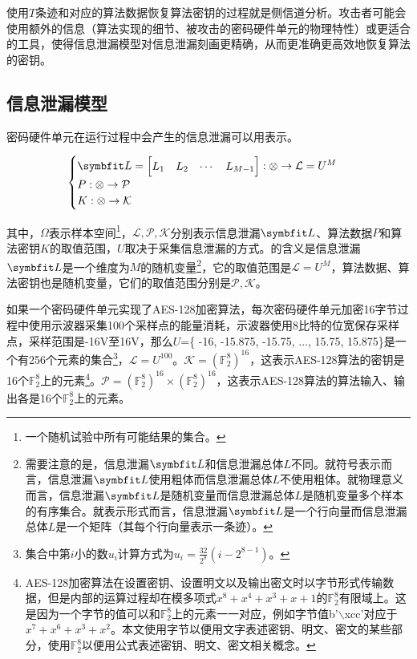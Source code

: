 {	使用$T$条迹和对应的算法数据恢复算法密钥的过程就是侧信道分析。攻击者可能会使用额外的信息（算法实现的细节、被攻击的密码硬件单元的物理特性）或更适合的工具，使得信息泄漏模型对信息泄漏刻画更精确，从而更准确更高效地恢复算法的密钥。
	
	\subsection{信息泄漏模型}
	
	密码硬件单元在运行过程中会产生的信息泄漏可以用表示。
	
	\begin{equation}
		\begin{cases}
			\Vector L=\begin{bmatrix}L_1&L_2&\cdots&L_{M-1}\end{bmatrix}:\mathcal \Omega\rightarrow \mathcal L=U^{M}\\
			P:\mathcal \Omega\rightarrow \mathcal P\\
			K:\mathcal \Omega\rightarrow \mathcal K
		\end{cases}\label{eq:leakagemodel}
	\end{equation}
	
	\noindent 其中，$\Omega$表示样本空间\footnote{一个随机试验中所有可能结果的集合。}，$\mathcal L,\mathcal P,\mathcal K$分别表示信息泄漏$\Vector L$、算法数据$P$和算法密钥$K$的取值范围，$U$取决于采集信息泄漏的方式。的含义是信息泄漏$\Vector L$是一个维度为$M$的随机变量\footnote{需要注意的是，信息泄漏$\Vector L$和信息泄漏总体$L$不同。就符号表示而言，信息泄漏$\Vector L$使用粗体而信息泄漏总体$L$不使用粗体。就物理意义而言，信息泄漏$\Vector L$是随机变量而信息泄漏总体$L$是随机变量多个样本的有序集合。就表示形式而言，信息泄漏$\Vector L$是一个行向量而信息泄漏总体$L$是一个矩阵（其每个行向量表示一条迹）。}，它的取值范围是$\mathcal L=U^M$，算法数据、算法密钥也是随机变量，它们的取值范围分别是$\mathcal P, \mathcal K$。
	
	\begin{example}
		如果一个密码硬件单元实现了AES-128加密算法，每次密码硬件单元加密16字节过程中使用示波器采集100个采样点的能量消耗，示波器使用8比特的位宽保存采样点，采样范围是-16V至16V，那么$U$=\{ -16, -15.875, -15.75, $\dots$, 15.75, 15.875\}是一个有256个元素的集合\footnote{集合中第$i$小的数$u_i$计算方式为$u_i=\frac{32}{2^8}(i-2^{8-1})$。}，$\mathcal L=U^{100}$。$\mathcal K=\left( {\mathbb F_2^8}\right) ^{16}$，这表示AES-128算法的密钥是16个$\mathbb F_2^8$上的元素\footnote{AES-128加密算法在设置密钥、设置明文以及输出密文时以字节形式传输数据，但是内部的运算过程却在模多项式$x^8+x^4+x^3+x+1$的$\mathbb F_2^8$有限域上。这是因为一个字节的值可以和$\mathbb F_2^8$上的元素一一对应，例如字节值b'$\backslash$xcc'对应于$x^7+x^6+x^3+x^2$。本文使用字节以便用文字表述密钥、明文、密文的某些部分，使用$\mathbb F_2^8$以便用公式表述密钥、明文、密文相关概念。}。$\mathcal P=\left( {\mathbb F_2^8}\right) ^{16}\times \left( {\mathbb F_2^8}\right) ^{16}$，这表示AES-128算法的算法输入、输出各是16个$\mathbb F_2^8$上的元素。
	\end{example}
	
}
